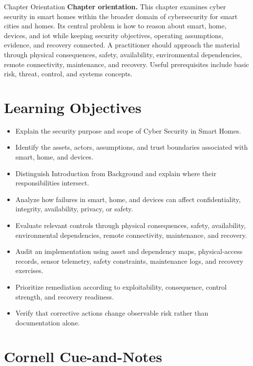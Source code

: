 \documentclass[11pt,letterpaper]{article}
\title{\CornellDocumentTitle}
\author{}
\date{}
\begin{document}
\maketitle
\begin{CornellOverviewBox}{Chapter Orientation}
\textbf{Chapter orientation.} This chapter examines cyber security in smart homes within the broader domain of cybersecurity for smart cities and homes. Its central problem is how to reason about smart, home, devices, and iot while keeping security objectives, operating assumptions, evidence, and recovery connected. A practitioner should approach the material through physical consequences, safety, availability, environmental dependencies, remote connectivity, maintenance, and recovery. Useful prerequisites include basic risk, threat, control, and systems concepts.
\end{CornellOverviewBox}
\section*{Learning Objectives}
\begin{itemize}
\item Explain the security purpose and scope of Cyber Security in Smart Homes.
\item Identify the assets, actors, assumptions, and trust boundaries associated with smart, home, and devices.
\item Distinguish Introduction from Background and explain where their responsibilities intersect.
\item Analyze how failures in smart, home, and devices can affect confidentiality, integrity, availability, privacy, or safety.
\item Evaluate relevant controls through physical consequences, safety, availability, environmental dependencies, remote connectivity, maintenance, and recovery.
\item Audit an implementation using asset and dependency maps, physical-access records, sensor telemetry, safety constraints, maintenance logs, and recovery exercises.
\item Prioritize remediation according to exploitability, consequence, control strength, and recovery readiness.
\item Verify that corrective actions change observable risk rather than documentation alone.
\end{itemize}
\section*{Cornell Cue-and-Notes}
\end{document}
